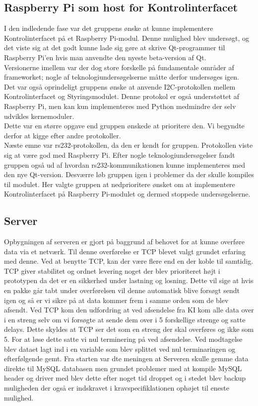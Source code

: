 
\subsection{Raspberry Pi som host for Kontrolinterfacet}
I den indledende fase var det gruppens ønske at kunne implementere Kontrolinterfacet på et Raspberry Pi-modul. Denne mulighed blev undersøgt, og det viste sig at det godt kunne lade sig gøre at skrive Qt-programmer til Raspberry Pi'en hvis man anvendte den nyeste beta-version af Qt.\\
Versionerne imellem var der dog store forskelle på fundamentale områder af frameworket; nogle af teknologiundersøgelserne måtte derfor undersøges igen.\\
Det var også oprindeligt gruppens ønske at anvende I2C-protokollen mellem Kontrolinterfacet og Styringsmodulet. Denne protokol er også understøttet af Raspberry Pi, men kan kun implementeres med Python medmindre der selv udvikles kernemoduler.\\
Dette var en større opgave end gruppen ønskede at prioritere den. Vi begyndte derfor at kigge efter andre protokoller.\\
Næste emne var rs232-protokollen, da den er kendt for gruppen. Protokollen viste sig at være god med Raspberry Pi. Efter nogle teknologiundersøgelser fandt gruppen også ud af hvordan rs232-kommunikationen kunne implementeres med den nye Qt-version.
Desværre løb gruppen igen i problemer da der skulle kompiles til modulet. Her valgte gruppen at nedprioritere ønsket om at implementere Kontrolinterfacet på Raspberry Pi-modulet og dermed stoppede undersøgelserne.

\subsection{Server}
Opbygningen af serveren er gjort på baggrund af behovet for at kunne overføre data via et netværk. Til denne overførelse er TCP blevet valgt grundet erfaring med denne. Ved at benytte TCP, kan der være flere end en der koble til samtidig. TCP giver stabilitet og ordnet levering noget der blev prioriteret højt i prototypen da det er en sikkerhed under lastning og losning. Dette vil sige at hvis en pakke går tabt under overførelsen vil denne automatisk blive forsøgt sendt igen og så er vi sikre på at data kommer frem i samme orden som de blev afsendt. 
Ved TCP kom den udfordring at ved afsendelse fra KI kom alle data over i en streng selv om vi forsøgte at sende dem over i 5 forskellige strenge og satte delays. Dette skyldes at TCP ser det som en streng der skal overføres og ikke som 5. For at løse dette satte vi nul terminering på ved afsendelse. Ved modtagelse blev dataet lagt ind i en variable som blev splittet ved nul terminaringen og efterfølgende gemt. Fra starten var dte meningen at Serveren skulle gemme data direkte til MySQL databasen men grundet problemer med at kompile MySQL header og driver med blev dette efter noget tid droppet og i stedet blev backup muligheden der også er indskravet i kravspecifiklationen ophøjet til eneste mulighed.

